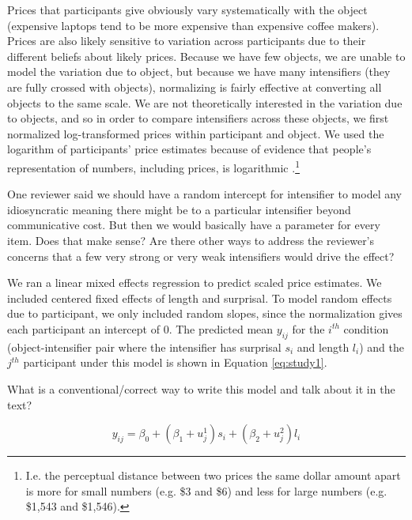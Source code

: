 \documentclass[10pt,letterpaper]{article}
\newcommand{\todo}[1]{{\color{red}#1}}
\begin{document}
Prices that participants give obviously vary systematically with the object (expensive laptops tend to be more expensive than expensive coffee makers).
Prices are also likely sensitive to variation across participants due to their different beliefs about likely prices.
Because we have few objects, we are unable to model the variation due to object, but because we have many intensifiers (they are fully crossed with objects), normalizing is fairly effective at converting all objects to the same scale.
We are not theoretically interested in the variation due to objects, and so in order to compare intensifiers across these objects, we first normalized log-transformed prices within participant and object.
We used the logarithm of participants' price estimates because of evidence that people's representation of numbers, including prices, is logarithmic \cite{fechner_elements_1860}.\footnote{
  I.e. the perceptual distance between two prices the same dollar amount apart is more for small numbers (e.g. \$3 and \$6) and less for large numbers (e.g. \$1,543 and \$1,546).
}

\todo{One reviewer said we should have a random intercept for intensifier to model any idiosyncratic meaning there might be to a particular intensifier beyond communicative cost. But then we would basically have a parameter for every item. Does that make sense? Are there other ways to address the reviewer's concerns that a few very strong or very weak intensifiers would drive the effect?}

We ran a linear mixed effects regression to predict scaled price estimates. We included centered fixed effects of length and surprisal. To model random effects due to participant, we only included random slopes, since the normalization gives each participant an intercept of 0.  %
The predicted mean $y_{ij}$ for the $i^{th}$ condition (object-intensifier pair where the intensifier has surprisal $s_i$ and length $l_i$) and the $j^{th}$ participant under this model is shown in Equation \ref{eq:study1}.

\todo{What is a conventional/correct way to write this model and talk about it in the text?}

\begin{equation}
\label{eq:study1}
y_{ij} = \beta_0 + (\beta_1 + u^1_{j})s_i + (\beta_2 + u^2_{j})l_i
\end{equation}
\end{document}
